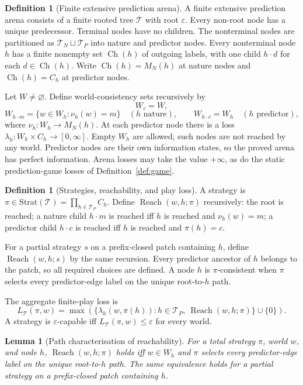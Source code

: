 \documentclass[11pt]{article}
\theoremstyle{plain}
\newtheorem{lemma}[theorem]{Lemma}
\theoremstyle{definition}
\newtheorem{definition}[theorem]{Definition}
\theoremstyle{remark}
\newcommand{\eps}{\varepsilon}
\begin{document}
\begin{definition}[Finite extensive prediction arena]\label{def:arena}
A finite extensive prediction arena consists of a finite rooted tree
$\mathcal T$ with root $\varepsilon$. Every non-root node has a unique
predecessor. Terminal nodes have no children. The nonterminal nodes are partitioned as $\mathcal T_N\sqcup \mathcal T_P$ into nature and
predictor nodes. Every nonterminal node $h$ has a finite nonempty set
$\operatorname{Ch}(h)$ of outgoing labels, with one child $h\cdot d$ for each
$d\in\operatorname{Ch}(h)$. Write
$\operatorname{Ch}(h)=M_N(h)$ at nature nodes and
$\operatorname{Ch}(h)=C_h$ at predictor nodes.

Let $W\ne\varnothing$. Define world-consistency sets recursively by
\[
W_\varepsilon=W,
\]
\[
W_{h\cdot m}=\{w\in W_h:\nu_h(w)=m\}
\quad(h\text{ nature}),
\qquad
W_{h\cdot c}=W_h
\quad(h\text{ predictor}),
\]
where $\nu_h:W_h\to M_N(h)$. At each predictor node there is a loss
$\lambda_h:W_h\times C_h\to[0,\infty]$. Empty $W_h$ are allowed; such nodes are
not reached by any world. Predictor nodes are their own information states, so
the proved arena has perfect information. Arena losses may take the value
$+\infty$, as do the static prediction-game losses of Definition~\ref{def:game}.
\end{definition}

\begin{definition}[Strategies, reachability, and play loss]\label{def:reach}
A strategy is $\pi\in\mathrm{Strat}(\mathcal T)=\prod_{h\in \mathcal T_P}C_h$. Define
$\operatorname{Reach}(w,h;\pi)$ recursively: the root is reached; a nature child
$h\cdot m$ is reached iff $h$ is reached and $\nu_h(w)=m$; a predictor child
$h\cdot c$ is reached iff $h$ is reached and $\pi(h)=c$.

For a partial strategy $s$ on a prefix-closed patch containing $h$, define
$\operatorname{Reach}(w,h;s)$ by the same recursion. Every predictor ancestor of
$h$ belongs to the patch, so all required choices are defined. A node $h$ is
$\pi$-consistent when $\pi$ selects every predictor-edge label on the unique
root-to-$h$ path.

The aggregate finite-play loss is
\[
L_{\mathcal T}(\pi,w)=
\max\left(
\{\lambda_h(w,\pi(h)):
 h\in \mathcal T_P,\ \operatorname{Reach}(w,h;\pi)\}\cup\{0\}
\right).
\]
A strategy is $\eps$-capable iff
$L_{\mathcal T}(\pi,w)\le\eps$ for every world.
\end{definition}

\begin{lemma}[Path characterisation of reachability]\label{lem:path-reach}
For a total strategy $\pi$, world $w$, and node $h$,
$\operatorname{Reach}(w,h;\pi)$ holds iff $w\in W_h$ and $\pi$ selects every
predictor-edge label on the unique root-to-$h$ path. The same equivalence holds
for a partial strategy on a prefix-closed patch containing $h$.
\end{lemma}
\end{document}
